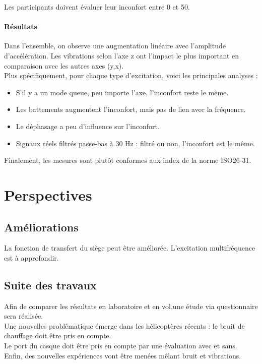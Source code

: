 \documentclass[12pt]{article}
\begin{document}
Les participants doivent évaluer leur inconfort entre 0 et 50. \\
\paragraph{Résultats}
Dans l'ensemble, on observe une augmentation linéaire avec l'amplitude d'accélération. Les vibrations selon l'axe z ont l'impact le plus important en comparaison avec les autres axes (y,x). \\
Plus spécifiquement, pour chaque type d'excitation, voici les principales analyses :
\begin{itemize}
	\item S'il y a un mode queue, peu importe l'axe, l'inconfort reste le même.
	\item Les battements augmentent l'inconfort, mais pas de lien avec la fréquence. 
	\item Le déphasage a peu d'influence sur l'inconfort.
	\item Signaux réels filtrés passe-bas à 30 Hz : filtré ou non, l'inconfort est le même.
\end{itemize}
Finalement, les mesures sont plutôt conformes aux index de la norme ISO26-31. 

\section{Perspectives}

\subsection{Améliorations}
La fonction de transfert du siège peut être améliorée. L'excitation multifréquence est à approfondir.

\subsection{Suite des travaux}

Afin de comparer les résultats en laboratoire et en vol,une étude via questionnaire sera réalisée.\\
Une nouvelles problématique émerge dans les hélicoptères récents : le bruit de chauffage doit être pris en compte.\\
Le port du casque doit être pris en compte par une évaluation avec et sans.\\
Enfin, des nouvelles expériences vont être menées mêlant bruit et vibrations.
\end{document}
